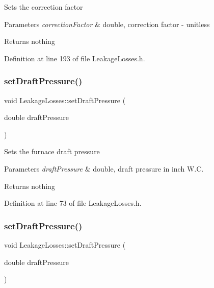 Sets the correction factor


\begin{DoxyParams}{Parameters}
{\em correction\+Factor} & double, correction factor -\/ unitless\\
\hline
\end{DoxyParams}
\begin{DoxyReturn}{Returns}
nothing 
\end{DoxyReturn}


Definition at line 193 of file Leakage\+Losses.\+h.

\mbox{\label{class_leakage_losses_a33f31dc336fc6af0fd1e8c8739f37b1a}} 
\subsubsection{\texorpdfstring{set\+Draft\+Pressure()}{setDraftPressure()}\hspace{0.1cm}{\footnotesize\ttfamily [1/3]}}
{\footnotesize\ttfamily void Leakage\+Losses\+::set\+Draft\+Pressure (\begin{DoxyParamCaption}\item[{double}]{draft\+Pressure }\end{DoxyParamCaption})\hspace{0.3cm}{\ttfamily [inline]}}

Sets the furnace draft pressure


\begin{DoxyParams}{Parameters}
{\em draft\+Pressure} & double, draft pressure in inch W.\+C.\\
\hline
\end{DoxyParams}
\begin{DoxyReturn}{Returns}
nothing 
\end{DoxyReturn}


Definition at line 73 of file Leakage\+Losses.\+h.

\mbox{\label{class_leakage_losses_a33f31dc336fc6af0fd1e8c8739f37b1a}} 
\subsubsection{\texorpdfstring{set\+Draft\+Pressure()}{setDraftPressure()}\hspace{0.1cm}{\footnotesize\ttfamily [2/3]}}
{\footnotesize\ttfamily void Leakage\+Losses\+::set\+Draft\+Pressure (\begin{DoxyParamCaption}\item[{double}]{draft\+Pressure }\end{DoxyParamCaption})\hspace{0.3cm}{\ttfamily [inline]}}

